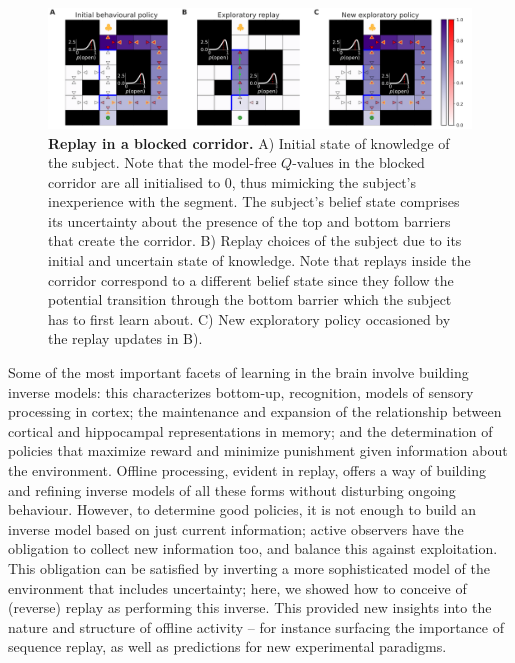 \begin{figure}[h!]
    \centering
    \includegraphics[width=1\textwidth]{Figures/fig4.png}
    \caption{\footnotesize \textbf{Replay in a blocked corridor.} A) Initial state of knowledge of the subject. Note that the model-free $Q$-values in the blocked corridor are all initialised to $0$, thus mimicking the subject's inexperience with the segment. The subject's belief state comprises its uncertainty about the presence of the top and bottom barriers that create the corridor. B) Replay choices of the subject due to its initial and uncertain state of knowledge. Note that replays inside the corridor correspond to a different belief state since they follow the potential transition through the bottom barrier which the subject has to first learn about. C) New exploratory policy occasioned by the replay updates in B).}
    \label{fig:fig4}
\end{figure}

Some of the most important facets of learning in the brain involve building inverse models: this characterizes bottom-up, recognition, models of sensory processing in cortex; the maintenance and expansion of the relationship between cortical and hippocampal representations in memory; and the determination of policies that maximize reward and minimize punishment given information about the environment. Offline processing, evident in replay, offers a way of building and refining inverse models of all these forms without disturbing ongoing behaviour. However, to determine good policies, it is not enough to build an inverse model based on just current information; active observers have the obligation to collect new information too, and balance this against exploitation. This obligation can be satisfied by inverting a more sophisticated model of the environment that includes uncertainty; here, we showed how to conceive of (reverse) replay as performing this inverse. This provided new insights into the nature and structure of offline activity -- for instance surfacing the importance of sequence replay, as well as predictions for new experimental paradigms.

